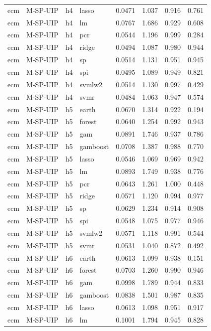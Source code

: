 \begin{ThreePartTable}
\begin{longtable}[t]{llclcccc}
ecm & M-SP-UIP & h4 & lasso & 0.0471 & 1.037 & 0.916 & 0.761\\
ecm & M-SP-UIP & h4 & lm & 0.0767 & 1.686 & 0.929 & 0.608\\
ecm & M-SP-UIP & h4 & pcr & 0.0544 & 1.196 & 0.999 & 0.284\\
ecm & M-SP-UIP & h4 & ridge & 0.0494 & 1.087 & 0.980 & 0.944\\
ecm & M-SP-UIP & h4 & sp & 0.0514 & 1.131 & 0.951 & 0.945\\
ecm & M-SP-UIP & h4 & spi & 0.0495 & 1.089 & 0.949 & 0.821\\
ecm & M-SP-UIP & h4 & svmlw2 & 0.0514 & 1.130 & 0.997 & 0.429\\
ecm & M-SP-UIP & h4 & svmr & 0.0484 & 1.063 & 0.947 & 0.574\\
\addlinespace
ecm & M-SP-UIP & h5 & earth & 0.0670 & 1.314 & 0.922 & 0.194\\
ecm & M-SP-UIP & h5 & forest & 0.0640 & 1.254 & 0.992 & 0.943\\
ecm & M-SP-UIP & h5 & gam & 0.0891 & 1.746 & 0.937 & 0.786\\
ecm & M-SP-UIP & h5 & gamboost & 0.0708 & 1.387 & 0.988 & 0.770\\
ecm & M-SP-UIP & h5 & lasso & 0.0546 & 1.069 & 0.969 & 0.942\\
ecm & M-SP-UIP & h5 & lm & 0.0893 & 1.749 & 0.938 & 0.776\\
ecm & M-SP-UIP & h5 & pcr & 0.0643 & 1.261 & 1.000 & 0.448\\
ecm & M-SP-UIP & h5 & ridge & 0.0571 & 1.120 & 0.994 & 0.977\\
ecm & M-SP-UIP & h5 & sp & 0.0629 & 1.234 & 0.914 & 0.908\\
ecm & M-SP-UIP & h5 & spi & 0.0548 & 1.075 & 0.977 & 0.946\\
ecm & M-SP-UIP & h5 & svmlw2 & 0.0571 & 1.118 & 0.991 & 0.544\\
ecm & M-SP-UIP & h5 & svmr & 0.0531 & 1.040 & 0.872 & 0.492\\
\addlinespace
ecm & M-SP-UIP & h6 & earth & 0.0613 & 1.099 & 0.938 & 0.151\\
ecm & M-SP-UIP & h6 & forest & 0.0703 & 1.260 & 0.990 & 0.946\\
ecm & M-SP-UIP & h6 & gam & 0.0998 & 1.789 & 0.944 & 0.833\\
ecm & M-SP-UIP & h6 & gamboost & 0.0838 & 1.501 & 0.987 & 0.835\\
ecm & M-SP-UIP & h6 & lasso & 0.0613 & 1.098 & 0.951 & 0.917\\
ecm & M-SP-UIP & h6 & lm & 0.1001 & 1.794 & 0.945 & 0.828\\

\end{longtable}
\end{ThreePartTable}
